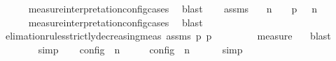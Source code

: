 \begin{isabellebody}
\ \ \ \ \isamarkupfalse%
\ measure{\isacharunderscore}interpretation{\isacharunderscore}config{\isachardot}cases\ \isamarkupfalse%
\ blast\isanewline
\ \ \isamarkupfalse%
\ assms\ \isamarkupfalse%
\ {\isasymGamma}\ n\ {\isasymPsi}\ {\isasymPhi}\ \ p{}{\isacharcolon}{\isacartoucheopen}{\isasymS}\ {\isacharequal}\ {\isacharparenleft}{\isasymGamma}\ n\ {\isasymturnstile}\ {\isasymPsi}\ {\isasymtriangleright}\ {\isasymPhi}\isanewline
\ \ \ \ \isamarkupfalse%
\ measure{\isacharunderscore}interpretation{\isacharunderscore}config{\isachardot}cases\ \isamarkupfalse%
\ blast\isanewline
\ \ \isamarkupfalse%
\ elimation{\isacharunderscore}rules{\isacharunderscore}strictly{\isacharunderscore}decreasing{\isacharunderscore}meas\ assms\ p{}\ p{}\isanewline
\ \ \ \ \isamarkupfalse%
\ {\isacartoucheopen}{\isacharparenleft}{\isasymPsi}\ {\isasymPsi}\ {\isasymin}\ measure\ {\isasymmu}{\isacartoucheclose}\ \isamarkupfalse%
\ blast\isanewline
\ \ \isamarkupfalse%
\ {\isacartoucheopen}{\isasymmu}\ {\isasymPsi}\ {\isacharless}\ {\isasymmu}\ {\isasymPsi}\ \isamarkupfalse%
\ simp\isanewline
\ \ \isamarkupfalse%
\ {\isacartoucheopen}{\isasymmu}\isactrlsub c\isactrlsub o\isactrlsub n\isactrlsub f\isactrlsub i\isactrlsub g\ {\isacharparenleft}{\isasymGamma}\ n\ {\isasymturnstile}\ {\isasymPsi}\ {\isasymtriangleright}\ {\isasymPhi}\ {\isacharless}\ {\isasymmu}\isactrlsub c\isactrlsub o\isactrlsub n\isactrlsub f\isactrlsub i\isactrlsub g\ {\isacharparenleft}{\isasymGamma}\ n\ {\isasymturnstile}\ {\isasymPsi}\ {\isasymtriangleright}\ {\isasymPhi}\ \isamarkupfalse%
\ simp\isanewline
\ \ \isamarkupfalse%

\end{isabellebody}
